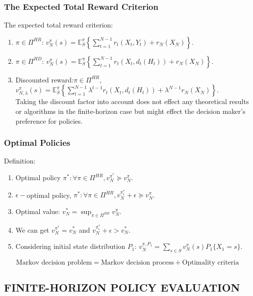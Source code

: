 \subsubsection{The Expected Total Reward Criterion}%

The expected total reward criterion:
\begin{enumerate}
    \item $ \pi \in \Pi^{HR} $:
        $ v^\pi_N(s) = \mathbb{E}^\pi_S \left\{ \sum^{N-1}_{t=1} r_t(X_t, Y_t) + r_N(X_N) \right\}. $
    \item $ \pi \in \Pi^{HD} $:
        $ v^\pi_N(s) = \mathbb{E}^\pi_S \left\{ \sum^{N-1}_{t=1} r_t(X_t, d_t(H_t)) + r_N(X_N) \right\}. $
    \item Discounted reward:$ \pi \in \Pi^{HR} $,\\
        $ v^\pi_{N, \lambda}(s) = \mathbb{E}^\pi_S \left\{ \sum^{N-1}_{t=1} \lambda^{t-1}r_t(X_t, d_t(H_t)) + \lambda^{N-1}r_N(X_N) \right\}. $\\
        Taking the discount factor into account does not effect any theoretical results or algorithms in the finite-horizon case but might effect the decision maker's preference for policies.
\end{enumerate}

\subsubsection{Optimal Policies}
Definition:
\begin{enumerate}
    \item Optimal policy $ \pi^*: \forall \pi \in \Pi^{HR}, v^{\pi^*}_N \succeq v^\pi_N $.
    \item $ \epsilon-$optimal policy, $ \pi^*: \forall \pi \in \Pi^{HR}, v^{\pi^*_\epsilon}_N + \epsilon \succeq v^\pi_N $.
    \item Optimal value: $ v^*_N = \sup_{\pi\in\Pi^{HR}} v^\pi_N $. 
    \item We can get $ v^{\pi^*}_N = v^*_N $ and $ v^{\pi^*_\epsilon}_N + \epsilon > v^*_N $.
    \item Considering initial state distribution $ P_1 $:
        $ v^{\pi, P_1}_N = \sum^{}_{s\in S} v^\pi_{N}(s) P_1 \{ X_1 = s \} $.
\end{enumerate}
\[   
    \text{Markov decision problem} = \text{Markov decision process} + \text{Optimality criteria}
\]

\subsection{FINITE-HORIZON POLICY EVALUATION}%
\label{sub:finite_horizon_policy_evaluation}

